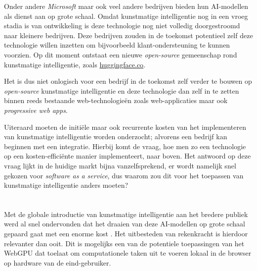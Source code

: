 Onder andere \textit{Microsoft} maar ook veel andere bedrijven bieden hun AI-modellen als dienst aan op grote schaal. Omdat kunstmatige intelligentie nog in een vroeg stadia is van ontwikkeling is deze technologie nog niet volledig doorgestroomd naar kleinere bedrijven. Deze bedrijven zouden in de toekomst potentieel zelf deze technologie willen inzetten om bijvoorbeeld klant-ondersteuning te kunnen voorzien. Op dit moment ontstaat een nieuwe \textit{open-source} gemeenschap rond kunstmatige intelligentie, zoals \href{https://huggingface.co/}{huggingface.co}.

\bigbreak{}

Het is dus niet onlogisch voor een bedrijf in de toekomst zelf verder te bouwen op \textit{open-source} kunstmatige intelligentie en deze technologie dan zelf in te zetten binnen reeds bestaande web-technologieën zoals web-applicaties maar ook \textit{progressive web apps}.

\bigbreak{}

Uiteraard moeten de initiële maar ook recurrente kosten van het implementeren van kunstmatige intelligentie worden onderzocht; alvorens een bedrijf kan beginnen met een integratie. Hierbij komt de vraag, hoe men zo een technologie op een kosten-efficiënte manier implementeert, naar boven. Het antwoord op deze vraag lijkt in de huidige markt bijna vanzelfsprekend, er wordt namelijk snel gekozen voor \textit{software as a service}, dus waarom zou dit voor het toepassen van kunstmatige intelligentie anders moeten?



\section{}%
\label{sec:probleemstelling}


Met de globale introductie van kunstmatige intelligentie aan het bredere publiek werd al snel ondervonden dat het draaien van deze AI-modellen op grote schaal gepaard gaat met een enorme kost \textcite{}. Het uitbesteden van rekenkracht is hierdoor relevanter dan ooit. Dit is mogelijks een van de potentiele toepassingen van het WebGPU dat toelaat om computationele taken uit te voeren lokaal in de browser op hardware van de eind-gebruiker.

